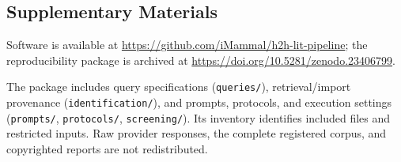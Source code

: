 \subsection{Supplementary Materials}
\label{sec:methodology-materials}
Software is available at \url{https://github.com/iMammal/h2h-lit-pipeline}; the reproducibility package is archived at \url{https://doi.org/10.5281/zenodo.23406799}.

The package includes query specifications (\texttt{queries/}), retrieval/import provenance (\texttt{identification/}), and prompts, protocols, and execution settings (\texttt{prompts/}, \texttt{protocols/}, \texttt{screening/}). Its inventory identifies included files and restricted inputs. Raw provider responses, the complete registered corpus, and copyrighted reports are not redistributed.


